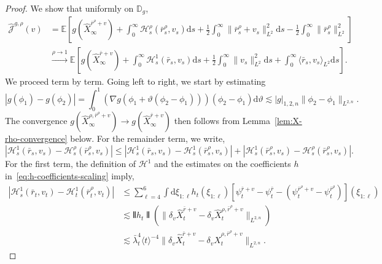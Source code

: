 \documentclass[11pt, a4paper]{scrartcl}
\numberwithin{equation}{section}
\theoremstyle{plain}
\theoremstyle{remark}
\newcommand{\mathd}{\mathrm{d}}
\newcommand{\tmtextit}[1]{\text{{\itshape{#1}}}}
\begin{document}
\begin{proof}
  \tmtextit{Convergence:} We show that uniformly on $\mathbb{D}_g$,
  \[ \begin{aligned}
       \hat{\mathcal{J}}^{g, \rho} (v) &= \mathbb{E} \left[ g
       (\hat{X}_{\infty}^{\bar{r}^{\rho} + v}) + \int_0^{\infty}
       \mathcal{H}_s^{\rho} (\bar{r}^{\rho}_s, v_s) \mathd s + \frac{1}{2}
       \int_0^{\infty} \| \bar{r}^{\rho}_s + v_s \|^2_{L^2} \mathd s -
       \frac{1}{2} \int_0^{\infty} \| \bar{r}^{\rho}_s \|^2_{L^2} \right]\\
       &\overset{\rho \rightarrow 1}{\longrightarrow}  \mathbb{E} \left[ g
       (\hat{X}_{\infty}^{\bar{r} + v}) + \int_0^{\infty} \mathcal{H}_s^1
       (\bar{r}_s, v_s) \mathd s + \frac{1}{2} \int_0^{\infty} \| v_s
       \|^2_{L^2} \mathd s + \int_0^{\infty} \langle \bar{r}_s, v_s
       \rangle_{L^2} \mathd s \right] .
     \end{aligned} \]
  We proceed term by term. Going left to right, we start by estimating
  \[ | g (\phi_1) - g (\phi_2) | = \int_0^1 (\nabla g (\phi_1 + \vartheta
     (\phi_2 - \phi_1))) (\phi_2 - \phi_1) \mathd \vartheta \lesssim | g |_{1,
     2, n} \| \phi_2 - \phi_1 \|_{L^{2, n}} . \]
  The convergence $g (\hat{X}_{\infty}^{\rho, \bar{r}^{\rho} + v}) \rightarrow
  g (\hat{X}_{\infty}^{\bar{r} + v})$ then follows from
  Lemma~\ref{lem:X-rho-convergence} below. For the remainder term, we write,
  \[ | \mathcal{H}_s^1 (\bar{r}_s, v_s) -\mathcal{H}_s^{\rho}
     (\bar{r}^{\rho}_s, v_s) | \leqslant | \mathcal{H}_s^1 (\bar{r}_s, v_s)
     -\mathcal{H}_s^1 (\bar{r}^{\rho}_s, v_s) | + | \mathcal{H}_s^1
     (\bar{r}^{\rho}_s, v_s) -\mathcal{H}_s^{\rho} (\bar{r}^{\rho}_s, v_s) | .
  \]
  For the first term, the definition of $\mathcal{H}^1$ and the estimates on
  the coefficients $h$ in~\eqref{eq:h-coefficients-scaling} imply,
  \[ \begin{aligned}
       | \mathcal{H}_s^1 (\bar{r}_t, v_t) -\mathcal{H}_t^1 (\bar{r}^{\rho}_t,
       v_t) | &\leqslant  \sum_{\ell = 4}^6 \int \mathd \xi_{1 : \ell} h_t
       (\xi_{1 : \ell}) [\psi^{\bar{r} + v}_t - \psi^{\bar{r}}_t -
       (\psi^{\bar{r}^{\rho} + v}_t - \psi^{\bar{r}^{\rho}}_t)] (\xi_{1 :
       \ell})\\
       & \lesssim  \interleave h_t \interleave (\| \delta_v 
       \hat{X}_t^{\bar{r} + v} - \delta_v  \hat{X}_t^{\rho, \bar{r}^{\rho} +
       v} \|_{L^{2, n}})\\
       & \lesssim  \bar{\lambda}_t^4 \langle t \rangle^{- 4} \| \delta_v 
       \hat{X}_t^{\bar{r} + v} - \delta_v  \hat{X}_t^{\rho, \bar{r}^{\rho} +
       v} \|_{L^{2, n}} .

\end{aligned}\]
\end{proof}
\end{document}
